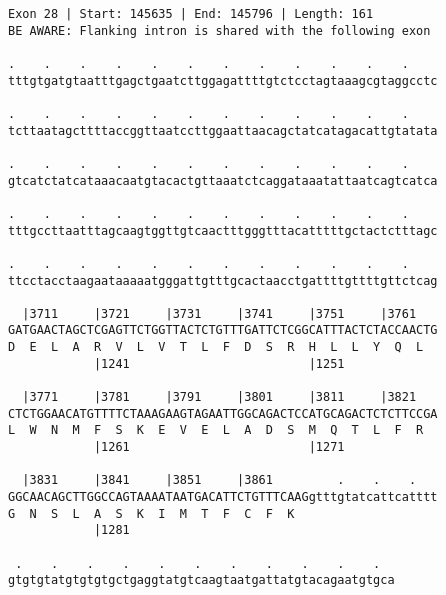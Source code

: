 \documentclass{article}
\begin{document}
\begin{Verbatim}[fontfamily=courier]
Exon 28 | Start: 145635 | End: 145796 | Length: 161
BE AWARE: Flanking intron is shared with the following exon

.    .    .    .    .    .    .    .    .    .    .    .    
tttgtgatgtaatttgagctgaatcttggagattttgtctcctagtaaagcgtaggcctc

.    .    .    .    .    .    .    .    .    .    .    .    
tcttaatagcttttaccggttaatccttggaattaacagctatcatagacattgtatata

.    .    .    .    .    .    .    .    .    .    .    .    
gtcatctatcataaacaatgtacactgttaaatctcaggataaatattaatcagtcatca

.    .    .    .    .    .    .    .    .    .    .    .    
tttgccttaatttagcaagtggttgtcaactttgggtttacatttttgctactctttagc

.    .    .    .    .    .    .    .    .    .    .    .    
ttcctacctaagaataaaaatgggattgtttgcactaacctgattttgttttgttctcag

  |3711     |3721     |3731     |3741     |3751     |3761   
GATGAACTAGCTCGAGTTCTGGTTACTCTGTTTGATTCTCGGCATTTACTCTACCAACTG
D  E  L  A  R  V  L  V  T  L  F  D  S  R  H  L  L  Y  Q  L  
            |1241                         |1251             

  |3771     |3781     |3791     |3801     |3811     |3821   
CTCTGGAACATGTTTTCTAAAGAAGTAGAATTGGCAGACTCCATGCAGACTCTCTTCCGA
L  W  N  M  F  S  K  E  V  E  L  A  D  S  M  Q  T  L  F  R  
            |1261                         |1271             

  |3831     |3841     |3851     |3861         .    .    .   
GGCAACAGCTTGGCCAGTAAAATAATGACATTCTGTTTCAAGgtttgtatcattcatttt
G  N  S  L  A  S  K  I  M  T  F  C  F  K                    
            |1281                                           

 .    .    .    .    .    .    .    .    .    .    .  
gtgtgtatgtgtgtgctgaggtatgtcaagtaatgattatgtacagaatgtgca
\end{Verbatim}
\newpage
\end{document}

